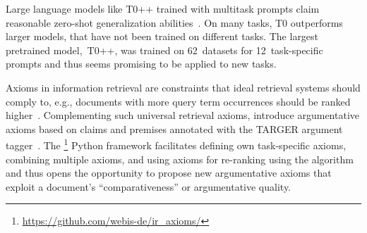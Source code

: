 

Large language models like T0++ trained with multitask prompts claim reasonable zero-shot generalization abilities~\cite{SanhWRBSACSLRDBXTSSKCNDCJWMSYPBWNRSSFFTBGBWR2021}.
On many tasks, T0 outperforms larger models, that have not been trained on different tasks. The largest pretrained model,~T0++, was trained on 62~datasets for 12~task-specific prompts and thus seems promising to be applied to new tasks.

Axioms in information retrieval are constraints that ideal retrieval systems should comply to, e.g., documents with more query term occurrences should be ranked higher~\citet{FangTZ2004}.
Complementing such universal retrieval axioms, \citet{BondarenkoHVSPB2018} introduce argumentative axioms based on claims and premises annotated with the TARGER argument tagger~\cite{ChernodubOHBHBP2019}.
The \iraxioms\footnote{\url{https://github.com/webis-de/ir_axioms/}} Python framework facilitates defining own task-specific axioms, combining multiple axioms, and using axioms for re-ranking using the \KwikSort algorithm~\cite{BondarenkoFRSVH2022,HagenVGS2016} and thus opens the opportunity to propose new argumentative axioms that exploit a document's ``comparativeness'' or argumentative quality.


